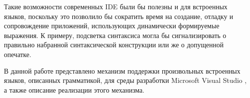 Такие возможности современных IDE были бы полезны и для встроенных языков, поскольку это позволило бы сократить время на создание, отладку и сопровождение приложений, использующих динамически формируемые выражения.  К примеру, подсветка синтаксиса могла бы сигнализировать о правильно набранной синтаксической конструкции или же о допущенной опечатке. 

В данной работе представлено механизм поддержки произвольных встроенных языков, описанных грамматикой, для среды разработки Microsoft Visual Studio \cite{MSVisualStudio}, а также описание реализации этого механизма. 